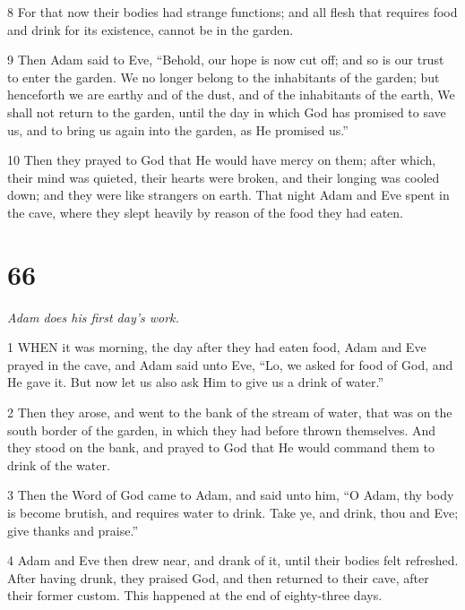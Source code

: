 \par 8 For that now their bodies had strange functions; and all flesh that requires food and drink for its existence, cannot be in the garden.

\par 9 Then Adam said to Eve, “Behold, our hope is now cut off; and so is our trust to enter the garden. We no longer belong to the inhabitants of the garden; but henceforth we are earthy and of the dust, and of the inhabitants of the earth, We shall not return to the garden, until the day in which God has promised to save us, and to bring us again into the garden, as He promised us.”

\par 10 Then they prayed to God that He would have mercy on them; after which, their mind was quieted, their hearts were broken, and their longing was cooled down; and they were like strangers on earth. That night Adam and Eve spent in the cave, where they slept heavily by reason of the food they had eaten.

\chapter{66}

\par \textit{Adam does his first day's work.}

\par 1 WHEN it was morning, the day after they had eaten food, Adam and Eve prayed in the cave, and Adam said unto Eve, “Lo, we asked for food of God, and He gave it. But now let us also ask Him to give us a drink of water.”

\par 2 Then they arose, and went to the bank of the stream of water, that was on the south border of the garden, in which they had before thrown themselves. And they stood on the bank, and prayed to God that He would command them to drink of the water.

\par 3 Then the Word of God came to Adam, and said unto him, “O Adam, thy body is become brutish, and requires water to drink. Take ye, and drink, thou and Eve; give thanks and praise.”

\par 4 Adam and Eve then drew near, and drank of it, until their bodies felt refreshed. After having drunk, they praised God, and then returned to their cave, after their former custom. This happened at the end of eighty-three days.

